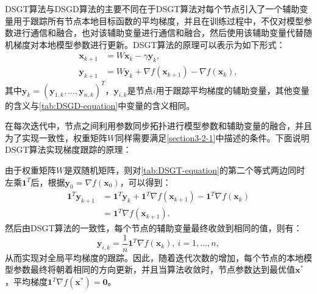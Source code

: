 DSGT算法与DSGD算法的主要不同在于DSGT算法对每个节点引入了一个辅助变量用于跟踪所有节点本地目标函数的平均梯度，并且在训练过程中，不仅对模型参数进行通信和融合，也对该辅助变量进行通信和融合，然后使用该辅助变量代替随机梯度对本地模型参数进行更新。DSGT算法的原理可以表示为如下形式：
\begin{equation}
    \label{tab:DSGT-equation}
    \begin{aligned}
        \boldsymbol{x}_{k+1}&=W\boldsymbol{x}_k-\gamma \boldsymbol{y}_k,
        \\
        \boldsymbol{y}_{k+1}&=W\boldsymbol{y}_k+\nabla f\left( \boldsymbol{x}_{k+1} \right) -\nabla f\left( \boldsymbol{x}_k \right),
    \end{aligned}
\end{equation}
其中$\boldsymbol{y}_k=\left( \boldsymbol{y}_{1,k},...,\boldsymbol{y}_{n,k} \right) ^T$，$\boldsymbol{y}_{i,k}$是节点$i$用于跟踪平均梯度的辅助变量，其他变量的含义与\autoref{tab:DSGD-equation}中变量的含义相同。

在每次迭代中，节点之间利用参数同步拓扑进行模型参数和辅助变量的融合，并且为了实现一致性，权重矩阵$W$同样需要满足\autoref{section3-2-1}中描述的条件。下面说明DSGT算法实现梯度跟踪的原理：

由于权重矩阵$W$是双随机矩阵，则对\autoref{tab:DSGT-equation}的第二个等式两边同时左乘$\mathbf{1}^T$后，根据$\boldsymbol{y}_0=\nabla f\left( \boldsymbol{x}_0 \right)$，可以得到：
\begin{equation}
    \label{tab:equ-4-3}
    \begin{aligned}
        \mathbf{1}^T\boldsymbol{y}_{k+1}&=\mathbf{1}^T\boldsymbol{y}_k+\mathbf{1}^T\nabla f\left( \boldsymbol{x}_{k+1} \right) -\mathbf{1}^T\nabla f\left( \boldsymbol{x}_k \right) 
        \\
        &=\mathbf{1}^T\nabla f\left( \boldsymbol{x}_{k+1} \right) .
    \end{aligned}
\end{equation}
然后由DSGT算法的一致性，每个节点的辅助变量最终收敛到相同的值，则有：
\begin{equation}
    \label{tab:equ-4-4}
    \boldsymbol{y}_{i,k}=\frac{1}{n}\mathbf{1}^T\nabla f\left( \boldsymbol{x}_k \right) ,\  i=1,...,n,
\end{equation}
从而实现对全局平均梯度的跟踪。因此，随着迭代次数的增加，每个节点的本地模型参数最终将朝着相同的方向更新，并且当算法收敛时，节点参数达到最优值$\boldsymbol{x}^*$，平均梯度$\mathbf{1}^T\nabla f\left( \boldsymbol{x}^* \right) =\mathbf{0}$。

